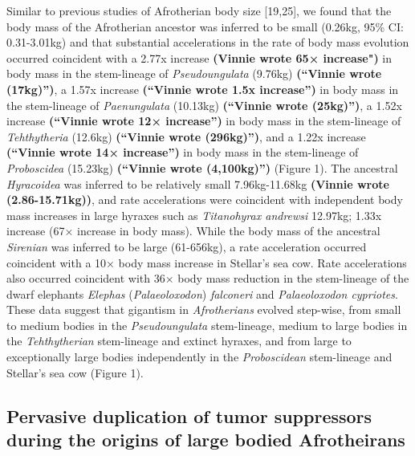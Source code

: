 \documentclass[10pt,letterpaper]{article}
\begin{document}
Similar to previous studies of Afrotherian body size {[}19,25{]}, we
found that the body mass of the Afrotherian ancestor was inferred to be
small (0.26kg, 95\% CI: 0.31-3.01kg) and that substantial accelerations
in the rate of body mass evolution occurred coincident with a 2.77x
increase \textbf{(Vinnie wrote 65× increase")} in body mass in the
stem-lineage of \emph{Pseudoungulata} (9.76kg) \textbf{(``Vinnie wrote
(17kg)'')}, a 1.57x increase \textbf{(``Vinnie wrote 1.5x increase'')}
in body mass in the stem-lineage of \emph{Paenungulata} (10.13kg)
\textbf{(``Vinnie wrote (25kg)'')}, a 1.52x increase \textbf{(``Vinnie
wrote 12× increase'')} in body mass in the stem-lineage of
\emph{Tehthytheria} (12.6kg) \textbf{(``Vinnie wrote (296kg)'')}, and a
1.22x increase \textbf{(``Vinnie wrote 14× increase'')} in body mass in
the stem-lineage of \emph{Proboscidea} (15.23kg) \textbf{(``Vinnie wrote
(4,100kg)'')} (Figure 1). The ancestral \emph{Hyracoidea} was inferred
to be relatively small 7.96kg-11.68kg \textbf{(Vinnie wrote
(2.86-15.71kg))}, and rate accelerations were coincident with
independent body mass increases in large hyraxes such as
\emph{Titanohyrax andrewsi} 12.97kg; 1.33x increase (67× increase in
body mass). While the body mass of the ancestral \emph{Sirenian} was
inferred to be large (61-656kg), a rate acceleration occurred coincident
with a 10× body mass increase in Stellar's sea cow. Rate accelerations
also occurred coincident with 36× body mass reduction in the
stem-lineage of the dwarf elephants \emph{Elephas}
(\emph{Palaeoloxodon}) \emph{falconeri} and \emph{Palaeoloxodon
cypriotes}. These data suggest that gigantism in \emph{Afrotherians}
evolved step-wise, from small to medium bodies in the
\emph{Pseudoungulata} stem-lineage, medium to large bodies in the
\emph{Tehthytherian} stem-lineage and extinct hyraxes, and from large to
exceptionally large bodies independently in the \emph{Proboscidean}
stem-lineage and Stellar's sea cow (Figure 1).

\hypertarget{pervasive-duplication-of-tumor-suppressors-during-the-origins-of-large-bodied-afrotheirans}{%
\subsection*{Pervasive duplication of tumor suppressors during the
origins of large bodied
Afrotheirans}\label{pervasive-duplication-of-tumor-suppressors-during-the-origins-of-large-bodied-afrotheirans}}
\end{document}
